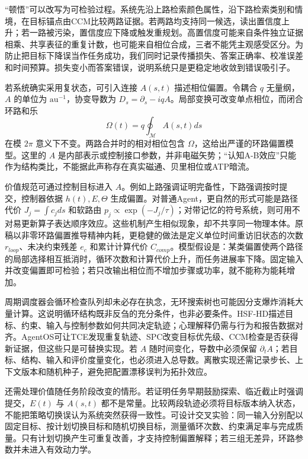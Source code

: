 “顿悟”可以改写为可检验过程。系统先沿上路检索颜色属性，沿下路检索类别和情境，在目标锚点由CCM比较两路证据。若两路均支持同一候选，读出置信度上升；若一路被污染，置信度应下降或触发重规划。高置信度可能来自条件独立证据相乘、共享表征的重复计数，也可能来自相位合成，三者不能凭主观感受区分。为防止把目标下降误当作任务成功，我们同时记录传播损失、答案正确率、校准误差和时间预算。损失变小而答案错误，说明系统只是更稳定地收敛到错误吸引子。

若系统确实采用复状态，可引入连接 $A(s,t)$ 描述相位偏置。令耦合 $q$ 无量纲，$A$ 的单位为 $\mathrm{au}^{-1}$，协变导数为 $D_s=\partial_s-iqA$。局部变换可改变单点相位，而闭合环路和乐
\begin{equation}
 \Omega(t)=q\oint_{\mathcal M}A(s,t)ds
\end{equation}
在模 $2\pi$ 意义下不变。两路合并时的相对相位包含 $\Omega$，这给出严谨的环路偏置模型。这里的 $A$ 是内部表示或控制接口参数，并非电磁矢势；“认知A-B效应”只能作为结构类比，不能据此声称存在真实磁通、贝里相位或ATP暗流。

价值规范可通过控制目标进入 $A$。例如上路强调证明完备性，下路强调按时提交，控制器依据 $h(t),E,\Theta$ 生成偏置。对普通Agent，更自然的形式可能是路径代价 $J_j=\int c_jds$ 和软路由 $p_j\propto\exp(-J_j/\tau)$；对带记忆的符号系统，则可用不对易更新算子表达顺序效应。这些机制产生相似现象，却不共享同一物理本体。原稿以非零环路偏置推导精神内耗，更稳健的做法是定义单位时间重访旧状态的次数 $r_{loop}$、未决约束残差 $e_c$ 和累计计算代价 $C_{comp}$。模型假设是：某类偏置使两个路径的局部选择相互抵消时，循环次数和计算代价上升，而任务进展率下降。固定输入并改变偏置即可检验；若只改输出相位而不增加步骤或功率，就不能称为能耗增加。

周期调度器会循环检查队列却未必存在执念，无环搜索树也可能因分支爆炸消耗大量计算。这说明循环结构既非反刍的充分条件，也非必要条件。HSF-HD描述目标、约束、输入与控制参数如何共同决定轨迹；心理解释仍需与行为和报告数据对齐。AgentOS可让TCE发现重复轨迹、SPC改变目标优先级、CCM检查是否获得新证据，但这些只是可替换实现。若 $A$ 随时间变化，导数中必须保留 $\partial_tA$；若目标、结构、输入和评价度量变化，也必须进入总导数。离散实现还需记录步长、上下文版本和随机种子，避免把配置漂移误判为拓扑效应。

还需处理价值随任务阶段改变的情形。若证明任务早期鼓励探索、临近截止时强调提交，$E(t)$ 与 $A(s,t)$ 都不是常量。比较两段轨迹必须将目标版本纳入状态，不能把策略切换误认为系统突然获得一致性。可设计交叉实验：同一输入分别配以固定目标、按计划切换目标和随机切换目标，测量循环次数、约束满足率与完成质量。只有计划切换产生可重复改善，才支持控制偏置解释；若三组无差异，环路参数并未进入有效动力学。

